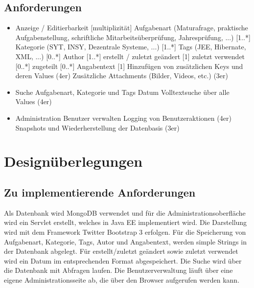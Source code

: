 \documentclass[a4paper,12pt]{scrreprt}
\begin{document}
\section{Anforderungen}
\begin{itemize}
\item Anzeige / Editierbarkeit [multiplizität]
\subitem Aufgabenart (Maturafrage, praktische Aufgabenstellung, schriftliche Mitarbeitsüberprüfung, Jahresprüfung, ...) [1..*]
\subitem Kategorie (SYT, INSY, Dezentrale Systeme, ...) [1..*]
\subitem Tags (JEE, Hibernate, XML, ...) [0..*]
\subitem Author [1..*]
\subitem erstellt / zuletzt geändert [1]
\subitem zuletzt verwendet [0..*]
\subitem zugeteilt [0..*]
\subitem Angabentext [1]
\subitem Hinzufügen von zusätzlichen Keys und deren Values (4er)
\subitem Zusätzliche Attachments (Bilder, Videos, etc.) (3er)
\item Suche
\subitem Aufgabenart, Kategorie und Tags
\subitem Datum
\subitem Volltextsuche über alle Values (4er)
\item Administration
\subitem Benutzer verwalten
\subitem Logging von Benutzeraktionen (4er)
\subitem Snapshots und Wiederherstellung der Datenbasis (3er)
\end{itemize}
\chapter{Designüberlegungen}
\section{Zu implementierende Anforderungen}
Als Datenbank wird MongoDB verwendet und für die Administrationsoberfläche wird ein Servlet erstellt, welches in Java EE implementiert wird. Die Darstellung wird mit dem Framework Twitter Bootstrap 3 erfolgen. Für die Speicherung von Aufgabenart, Kategorie, Tags, Autor und Angabentext, werden simple Strings in der Datenbank abgelegt. Für erstellt/zuletzt geändert sowie zuletzt verwendet wird ein Datum im entsprechenden Format abgespeichert. Die Suche wird über die Datenbank mit Abfragen laufen.
Die Benutzerverwaltung läuft über eine eigene Administrationsseite ab, die über den Browser aufgerufen werden kann.
\end{document}
